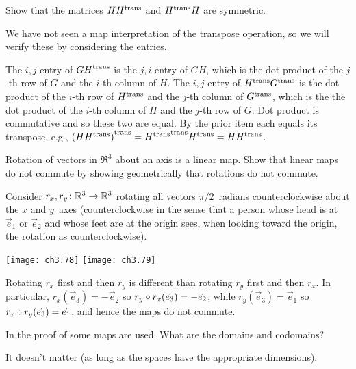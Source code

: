 \begin{exercises}
\begin{exparts}
        Show that
        the matrices \( H{{H}^{\rm trans}} \) and \( {{H}^{\rm trans}}H \) are symmetric.
    \end{exparts}
    \begin{answer}
      We have not seen a map interpretation of the transpose operation, so
      we will verify these by considering the entries.
      \begin{exparts}
        \partsitem  The \( i,j \) entry of \( {{GH}^{\rm trans}} \) is the $j,i$ entry
          of $GH$, which is the dot product of the
          \( j \)-th row of \( G \) and the \( i \)-th column of \( H \).
          The \( i,j \) entry of \( {{H}^{\rm trans}}{{G}^{\rm trans}} \) is the dot product of
          the \( i \)-th row of \( {{H}^{\rm trans}} \) and the \( j \)-th column of
          \( {{G}^{\rm trans}} \), which is the
          the dot product of the \( i \)-th column of \( H \) and the
          \( j \)-th row of \( G \).
          Dot product is commutative and so these two are equal.
        \partsitem By the prior item each equals its transpose, e.g.,
          ${{(H{{H}^{\rm trans}})}^{\rm trans}}={{{{H}^{\rm trans}}}^{\rm trans}}{{H}^{\rm trans}}=H{{H}^{\rm trans}}$.
      \end{exparts}  
    \end{answer}
  \recommended \item
    Rotation of vectors in \( \Re^3 \) about an axis is a linear map.
    Show that linear maps do not commute by     
    showing geometrically that rotations do not commute.
    \begin{answer}
      Consider \( \mbox{$r_x,r_y\colon \mathbb{R}^3\to \mathbb{R}^3$} \) rotating all vectors
      \( \pi/2 \)~radians
      counterclockwise about the \( x \) and \( y \)~axes 
      (counterclockwise in the sense that a person whose head is at
      \( \vec{e}_1 \) or \( \vec{e}_2 \) and whose feet are at the origin
      sees, when looking toward the origin, the rotation as
      counterclockwise).
      \begin{center}  \small
        \texttt{[image: ch3.78]}
        \qquad
        \texttt{[image: ch3.79]}
      \end{center}
      Rotating $r_x$ first and then $r_y$ is different than
      rotating $r_y$ first and then $r_x$.
      In particular, $r_x(\vec{e}_3)=-\vec{e}_2$
      so $r_y\mathbin\circ r_x(\vec{e}_3)=-\vec{e}_2$,
      while $r_y(\vec{e}_3)=\vec{e}_1$ so
      $r_x\mathbin\circ r_y(\vec{e}_3)=\vec{e}_1$,
      and hence the maps do not commute.
    \end{answer}
  \item \label{exer:MatProdPropsSpAndBas}
    In the proof of  some maps are used.
    What are the domains and codomains?
    \begin{answer}
      It doesn't matter (as long as the spaces have the appropriate 
     dimensions).


\end{answer}
\end{exercises}
